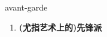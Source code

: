 
\begin{frame}
{\huge avant-garde}
\begin{center}
\begin{enumerate}\Large
  \item \textbf{(尤指艺术上的)先锋派}
\end{enumerate}
\end{center}
\end{frame}
